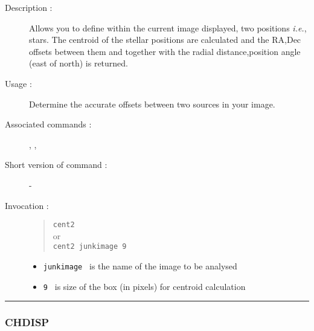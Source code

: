 \begin{description}

\item[Description :] Allows you to define within the current image
displayed, two positions \emph{i.e.}, stars. The centroid of the
stellar positions are calculated and the RA,Dec offsets between them
and together with the radial distance,position angle (east of north) is
returned.

\item[Usage :] Determine the accurate offsets between two sources in your image.  
\item[Associated commands :] {\tt {}}, 
{\tt {}}, {\tt {}} 

\item[Short version of command :] -
\item[Invocation :]

\begin{quote}{\tt  cent2 }\\ or \\ {\tt cent2 junkimage 9 } \end{quote}

\begin{itemize}

\item {\tt junkimage } is the name of the image to be analysed \item
{\tt 9 } is size of the box (in pixels) for centroid calculation

\end{itemize}

\end{description}

\hrule 
\subsubsection*{\label{CHDISP}CHDISP}

